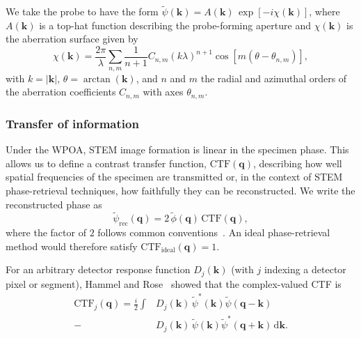 \documentclass[pdflatex,sn-aps,iicol]{sn-jnl}%
\begin{document}
We take the probe to have the form $\tilde{\psi}(\boldsymbol{k}) = A(\boldsymbol{k})\,\exp[-i\chi(\boldsymbol{k})]$, where $A(\boldsymbol{k})$ is a top-hat function describing the probe-forming aperture and $\chi(\boldsymbol{k})$ is the aberration surface given by
\begin{equation}
  \chi(\boldsymbol{k}) = \frac{2\pi}{\lambda} \sum_{n,m} \frac{1}{n+1} C_{n,m} (k\lambda)^{n+1} \cos\!\left[m(\theta-\theta_{n,m})\right],
  \label{eq:chi}
\end{equation}
with $k=\lvert\boldsymbol{k}\rvert$, $\theta=\arctan(\boldsymbol{k})$, and $n$ and $m$ the radial and azimuthal orders of the aberration coefficients $C_{n,m}$ with axes $\theta_{n,m}$.

\subsubsection*{Transfer of information}

Under the WPOA, STEM image formation is linear in the specimen phase.
This allows us to define a contrast transfer function, $\mathrm{CTF}(\boldsymbol{q})$, describing how well spatial frequencies of the specimen are transmitted or, in the context of STEM phase-retrieval techniques, how faithfully they can be reconstructed.
We write the reconstructed phase as
\begin{equation}
  \tilde{\psi}_{\text{rec}}(\boldsymbol{q}) = 2\,\tilde{\phi}(\boldsymbol{q})\,\mathrm{CTF}(\boldsymbol{q}),
  \label{eq:recon-ctf}
\end{equation}
where the factor of $2$ follows common conventions~\cite{Dwyer_2024,Vega_2025}.
An ideal phase-retrieval method would therefore satisfy $\mathrm{CTF}_{\text{ideal}}(\boldsymbol{q})=1$.

For an arbitrary detector response function $D_j(\boldsymbol{k})$ (with $j$ indexing a detector pixel or segment), Hammel and Rose~\cite{Hammel_1995} showed that the complex-valued CTF is~\cite{Hammel_1995,rose_1977}
\begin{align}
  \mathrm{CTF}_j(\boldsymbol{q}) = \frac{i}{2} \int
    &D_j(\boldsymbol{k})\,\tilde{\psi}^{*}(\boldsymbol{k})\tilde{\psi}(\boldsymbol{q}-\boldsymbol{k}) \nonumber \\
    - &D_j(\boldsymbol{k})\,\tilde{\psi}(\boldsymbol{k})\tilde{\psi}^{*}(\boldsymbol{q}+\boldsymbol{k})
  \,\mathrm{d}\boldsymbol{k}.
  \label{eq:ctf}
\end{align}
\end{document}
